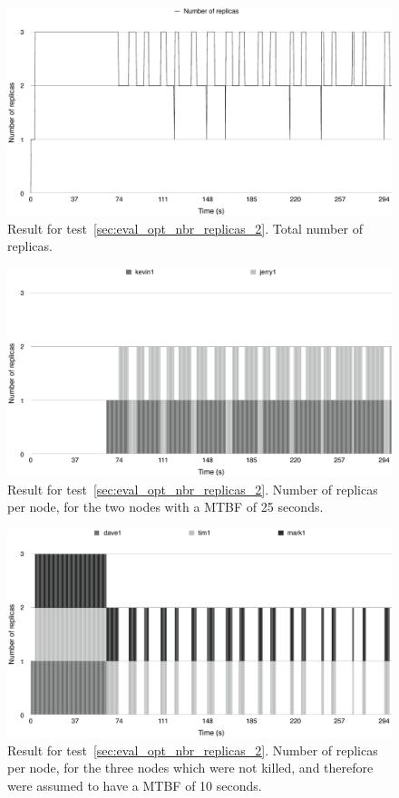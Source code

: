 \documentclass{cslthse-msc}
\begin{document}
\begin{figure}[!hbt]
\centering
\includegraphics[scale=0.5]{images/results/optimal_replicas/2/total.pdf}
\caption{Result for test~\ref{sec:eval_opt_nbr_replicas_2}. Total number of replicas.} \label{fig:exp_opt_replicas_total_2}
\end{figure}

\begin{figure}[!hbt]
\centering
\includegraphics[scale=0.5]{images/results/optimal_replicas/2/MTBF_25.pdf}
\caption{Result for test~\ref{sec:eval_opt_nbr_replicas_2}. Number of replicas per node, for the two nodes with a MTBF of 25 seconds.} \label{fig:exp_opt_replicas_MTBF_25_2}
\end{figure}

\begin{figure}[!hbt]
\centering
\includegraphics[scale=0.5]{images/results/optimal_replicas/2/MTBF_10.pdf}
\caption{Result for test~\ref{sec:eval_opt_nbr_replicas_2}. Number of replicas per node, for the three nodes which were not killed, and therefore were assumed to have a MTBF of 10 seconds.} \label{fig:exp_opt_replicas_MTBF_10_2}
\end{figure}
\end{document}
